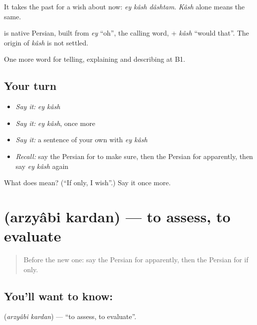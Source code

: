 It takes the past for a wish about now: \emph{ey kâsh dâshtam}. \emph{Kâsh} alone means the same.

\begin{cousinweb}
\textbf{ } is native Persian, built from \emph{ey} \textquotedblleft{}oh\textquotedblright{}, the calling word, + \emph{kâsh} \textquotedblleft{}would that\textquotedblright{}. The origin of \emph{kâsh} is not settled.
\end{cousinweb}

\begin{grammarlens}[title={What you've built}]
One more word for telling, explaining and describing at B1.
\end{grammarlens}

\subsection*{Your turn}
\begin{itemize}
\raggedright
  \item \emph{Say it:} \emph{ey kâsh}
  \item \emph{Say it:} \emph{ey kâsh}, once more
  \item \emph{Say it:} a sentence of your own with \emph{ey kâsh}
  \item \emph{Recall:} say the Persian for to make sure, then the Persian for apparently, then say \emph{ey kâsh} again
\end{itemize}

\begin{tcolorbox}[breakable,colback=teal!4,colframe=teal!35!black,title={Before you move on}]
What does   mean? (\textquotedblleft{}If only, I wish\textquotedblright{}.) Say it once more.
\end{tcolorbox}
\section[\texorpdfstring{\fa{ارزیابی} \fa{کردن} (arzyâbi kardan)}{ارزیابی کردن (arzyâbi kardan)}]{  (arzyâbi kardan) — to assess, to evaluate}

\label{lesson:FA-C394-arzyabi-kardan}



\begin{quote}
Before the new one: say the Persian for apparently, then the Persian for if only.
\end{quote}

\subsection*{You'll want to know:  }
\textbf{ } (\emph{arzyâbi kardan}) — \textquotedblleft{}to assess, to evaluate\textquotedblright{}.

